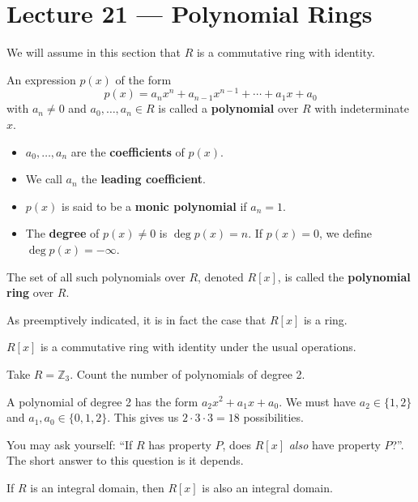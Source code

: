 \section{Lecture 21 — Polynomial Rings}

We will assume in this section that $R$ is a commutative ring with identity.

\begin{definition}[polynomial]
	An expression $p(x)$ of the form
	$$p(x)=a_nx^n+a_{n-1}x^{n-1}+\cdots+a_1x+a_0$$
	with $a_n\neq 0$ and $a_0,\hdots,a_n\in R$ is called a \textbf{polynomial} over $R$ with indeterminate $x$.
	\begin{itemize}
		\item $a_0,\hdots,a_n$ are the \textbf{coefficients} of $p(x)$.
		\item We call $a_n$ the \textbf{leading coefficient}.
		\item $p(x)$ is said to be a \textbf{monic polynomial} if $a_n=1$.
		\item The \textbf{degree} of $p(x)\neq 0$ is $\deg p(x)=n$. If $p(x)=0$, we define $\deg p(x)=-\infty$.
	\end{itemize}

	The set of all such polynomials over $R$, denoted $R[x]$, is called the \textbf{polynomial ring} over $R$.
\end{definition}

As preemptively indicated, it is in fact the case that $R[x]$ is a ring.

\begin{theorem}
	$R[x]$ is a commutative ring with identity under the usual operations.
\end{theorem}

\begin{example}
	Take $R=\mathbb Z_3$. Count the number of polynomials of degree 2.
	\begin{solution}
		A polynomial of degree 2 has the form $a_2x^2+a_1x+a_0$. We must have $a_2\in\{1,2\}$ and $a_1,a_0\in\{0,1,2\}$. This gives us $2\cdot 3\cdot 3=18$ possibilities.
	\end{solution}
\end{example}

You may ask yourself: ``If $R$ has property $P$, does $R[x]$ \textit{also} have property $P$?''. The short answer to this question is it depends.

\begin{theorem}
	If $R$ is an integral domain, then $R[x]$ is also an integral domain.
\end{theorem}

